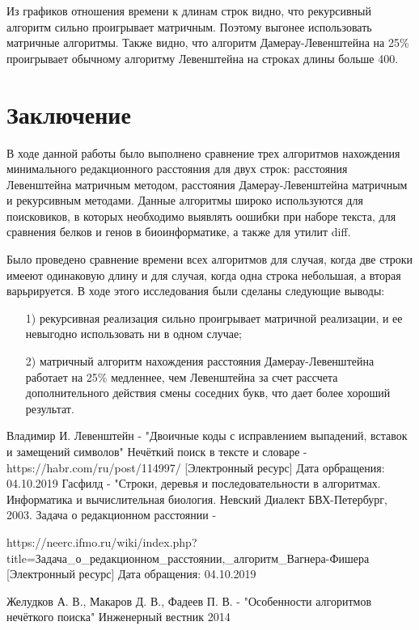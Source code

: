 \documentclass[a4paper,12pt]{article}
\newcommand{\anonsection}[1]{\section*{#1}\addcontentsline{toc}{section}{#1}}
\begin{document}
Из графиков отношения времени к длинам строк видно, что рекурсивный
алгоритм сильно проигрывает матричным. Поэтому выгонее использовать
матричные алгоритмы. Также видно, что алгоритм Дамерау-Левенштейна на 25\%
проигрывает обычному алгоритму Левенштейна на строках длины больше 400.

\newpage
\anonsection{Заключение}

В ходе данной работы было выполнено сравнение трех алгоритмов нахождения минимального редакционного расстояния для двух строк: расстояния Левенштейна матричным методом, расстояния Дамерау-Левенштейна матричным и рекурсивным методами. Данные алгоритмы широко используются для поисковиков, в которых необходимо выявлять оошибки при наборе текста, для сравнения белков и генов в биоинформатике, а также для утилит diff.

Было проведено сравнение времени всех алгоритмов для случая, когда две строки имееют одинаковую длину и для случая, когда одна строка небольшая, а вторая варьрируется. В ходе этого исследования были сделаны следующие выводы:

\begin{enumerate}
    \item[1)] рекурсивная реализация сильно проигрывает матричной реализации, и ее невыгодно использовать ни в одном случае;
    \item[2)] матричный алгоритм нахождения расстояния Дамерау-Левенштейна работает на 25\% медленнее, чем Левенштейна за счет рассчета дополнительного действия смены соседних букв, что дает более хороший результат.
\end{enumerate}

\newpage

\begin{thebibliography}{}
     Владимир И. Левенштейн - "Двоичные коды с исправлением выпадений, вставок и замещений символов"
     Нечёткий поиск в тексте и словаре - https://habr.com/ru/post/114997/ [Электронный ресурс] Дата орбращения: 04.10.2019
     Гасфилд - "Строки, деревья и последовательности в алгоритмах. Информатика и вычислительная биология. Невский Диалект БВХ-Петербург, 2003.
     Задача о редакционном расстоянии - 

    https://neerc.ifmo.ru/wiki/index.php?title=Задача\_о\_редакционном\_расстоянии,\_алгоритм\_Вагнера-Фишера [Электронный ресурс] Дата обращения: 04.10.2019

     Желудков А. В., Макаров Д. В., Фадеев П. В. - "Особенности алгоритмов нечёткого поиска" Инженерный вестник 2014
\end{thebibliography}
\end{document}
